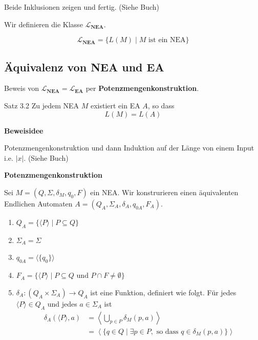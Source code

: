 \documentclass[a4paper, 11pt]{article}
\begin{document}
        Beide Inklusionen zeigen und fertig. (Siehe Buch)
    
        Wir definieren die Klasse $\mathbf{\mathcal{L}_{\text{NEA}}}$.
        \begin{mainbox}{}
            $$\mathbf{\mathcal{L}_{\text{NEA}}} = \{L(M) \mid M \text{ ist ein NEA}\}$$
        \end{mainbox}
    
    
    
        \subsection{Äquivalenz von NEA und EA}
        Beweis von $\mathbf{\mathcal{L}_{\text{NEA}}} = \mathbf{\mathcal{L}_{\text{EA}}}$ per \textbf{Potenzmengenkonstruktion}.
        \begin{mainbox}{Satz 3.2}
            Zu jedem NEA $M$ existiert ein EA $A$, so dass
            $$L(M) = L(A)$$
        \end{mainbox}
        \textbf{Beweisidee}
    
        Potenzmengenkonstruktion und dann Induktion auf der Länge von einem Input i.e. $|x|$. (Siehe Buch)
    
    
    
        \textbf{Potenzmengenkonstruktion}
        \begin{subbox}{}
            Sei $M = (Q, \Sigma, \delta_M, q_0, F)$ ein NEA. Wir konstrurieren einen äquivalenten Endlichen Automaten $A = (Q_A, \Sigma_A, \delta_A, q_{0A}, F_A)$.
            \begin{enumerate}[label = (\roman*)]
                \item $Q_A = \{\langle P \rangle \mid P \subseteq Q\}$
                \item $\Sigma_A = \Sigma$
                \item $q_{0A} = \langle\{q_0\}\rangle$
                \item $F_A = \{\langle P\rangle \mid P \subseteq Q \text{ und } P \cap F \neq \emptyset\}$
                \item $\delta_A: (Q_A \times \Sigma_A) \to Q_A$ ist eine Funktion, definiert wie folgt. Für  jedes $\langle P \rangle \in Q_A$ und jedes $a \in \Sigma_A$ ist 
                \begin{align*}
                    \delta_A(\langle P \rangle, a) &= \left\langle \bigcup_{p \in P} \delta_M(p, a) \right\rangle\\
                    &= \left\langle\{q \in Q \mid \exists p \in P, \text{ so dass }q \in \delta_{M}(p, a)\}\right\rangle
                \end{align*}
            \end{enumerate}
        \end{subbox}
    
\end{document}
